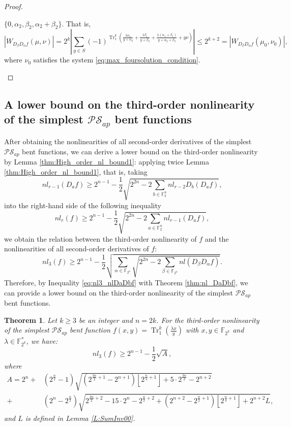 \documentclass{article}
\newcommand{\F}{\mathbb{F}}
\newcommand{\0}{\textbf{0}}
\newcommand{\1}{\textbf{1}}
\newcommand{\TRACE}{\operatorname{Tr}_1^k}
\theoremstyle{plain}
\newtheorem{theorem}{Theorem}
\begin{document}
\begin{proof}
\begin{enumerate}[label=\textbf{Case \arabic*},wide = 0pt]
            $\{0,\alpha_2,\beta_2,\alpha_2+\beta_2\}$. 
            That is,
            \[ |W_{D_{\beta}D_{\alpha}f}(\mu,\nu)|=2^k\left\lvert\sum_{y\in S}(-1)^{\TRACE\left(\frac{\lambda\alpha_1}{y+\alpha_2}+\frac{\lambda\beta_1}{y+\beta_2}+\frac{\lambda(\alpha_1+\beta_1)}{y+\alpha_2+\beta_2}+ y\nu\right)}\right\rvert\le 2^{k+2}=|W_{D_{\beta}D_{\alpha}f}(\mu_0,\nu_0)|, \]
            where $\nu_0$ satisfies the system \eqref{eq:max_foursolution_condition}.
        \end{enumerate}
    \end{proof}

\subsection{A lower bound on the third-order nonlinearity of the simplest $\mathcal{PS}_{ap}$ bent functions}
    After obtaining the nonlinearities of all second-order derivatives of the simplest $\mathcal{PS}_{ap}$ bent functions, we can derive a lower bound on the third-order nonlinearity by Lemma \ref{thm:High_order_nl_bound1}:
    applying twice Lemma \ref{thm:High_order_nl_bound1}, that is, taking
    \[nl_{r-1}(D_af) \ge 2^{n-1}-\frac{1}{2}\sqrt{2^{2n}-2\sum_{b\in\F_2^n}nl_{r-2}D_b(D_af)},\]
    into the right-hand side of the following inequality
    \[nl_r(f) \ge 2^{n-1}-\frac{1}{2}\sqrt{2^{2n}-2\sum_{a\in\F_2^n}nl_{r-1}(D_af)},\]
    we obtain the relation between the third-order nonlinearity of $f$ and the nonlinearities of all second-order derivatives of $f$:
    \begin{equation}\label{eq:nl3_nlDaDbf}
        nl_3(f)\ge 2^{n-1}-\frac{1}{2}\sqrt{\sum_{\alpha\in\F_{2^n}}\sqrt{2^{2n}-2\sum_{\beta\in\F_{2^n}} nl(D_{\beta}D_{\alpha}f)}}.
    \end{equation}
    Therefore, by Inequality \eqref{eq:nl3_nlDaDbf} with Theorem \ref{thm:nl_DaDbf}, we can provide a lower bound on the third-order nonlinearity of the simplest $\mathcal{PS}_{ap}$ bent functions.
    \begin{theorem}\label{th:our_lower_bound}
        Let $k\ge 3$ be an integer and $n=2k$. For the third-order nonlinearity of the simplest $\mathcal{PS}_{ap}$ bent function $f(x,y)=\TRACE(\frac{\lambda x}{y})$ with $x,y\in\F_{2^k}$ and $\lambda\in\F_{2^k}^*$, we have:
        \[nl_3(f)\ge 2^{n-1}-\frac{1}{2}\sqrt{A},\]
        where
        \begin{align*}
            A=2^n+&(2^{\frac{n}{2}}-1)\sqrt{(2^{\frac{3n}{2}+1}-2^{n+1})\left\lfloor 2^{\frac{n}{4}+1}\right\rfloor+5\cdot 2^{\frac{3n}{2}}-2^{n+2}}\\
            +&(2^n-2^{\frac{n}{2}})\sqrt{2^{\frac{3n}{2}+2}-15\cdot 2^n-2^{\frac{n}{2}+2}+(2^{n+2}-2^{\frac{n}{2}+1})\left\lfloor 2^{\frac{n}{4}+1}\right\rfloor+2^{n+2}L},
        \end{align*}
        and $L$ is defined in Lemma \ref{L:SumInv00}.
    \end{theorem}
\end{document}
